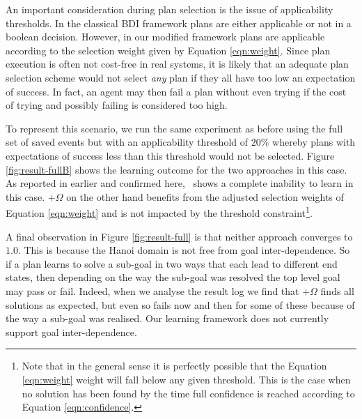 \begin{figure*}[t]
\begin{center}
\qquad
{}
\caption{Agent performance under \CL\ (circles) and \CL+$\Omega$ (crosses) schemes with applicability thresholds. Each point represents results from $5$ experiment runs using an averaging window of $200$ samples.}
\label{fig:result-full}
\end{center}
\end{figure*}


An important consideration during plan selection is the issue of applicability thresholds. In the classical BDI framework plans are either applicable or not in a boolean decision. However, in our modified framework plans are applicable according to the selection weight given by Equation \ref{eqn:weight}. Since plan execution is often not cost-free in real systems, it is likely that an adequate plan selection scheme would not select \textit{any} plan if they all have too low an expectation of success. In fact, an agent may then fail a plan without even trying if the cost of trying and possibly failing is considered too high. 

To represent this scenario, we run the same experiment as before using the full set of saved  events but with an applicability threshold of $20\%$ whereby plans with expectations of success less than this threshold would not be selected. Figure \ref{fig:result-fullB} shows the learning outcome for the two approaches in this case. As reported in \cite{Singh:AAMAS10} earlier and confirmed here, \CL\ shows a complete inability to learn in this case. \CL+$\Omega$ on the other hand benefits from the adjusted selection weights of Equation \ref{eqn:weight} and is not impacted by the threshold constraint\footnote{Note that in the general sense it is perfectly possible that the Equation \ref{eqn:weight} weight will fall below any given threshold. This is the case when no solution has been found by the time full confidence is reached according to Equation \ref{eqn:confidence}.}.

A final observation in Figure \ref{fig:result-full} is that neither approach converges to $1.0$. This is because the Hanoi domain is not free from goal inter-dependence. So if a plan learns to solve a sub-goal in two ways that each lead to different end states, then depending on the way the sub-goal was resolved the top level goal may pass or fail. Indeed, when we analyse the result log we find that \CL+$\Omega$ finds all solutions as expected, but even so fails now and then for some of these because of the way a sub-goal was realised. Our learning framework does not currently support goal inter-dependence.

